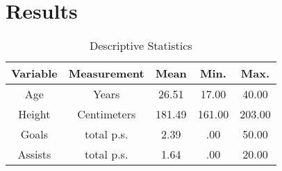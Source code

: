 \chapter{Results}

\lipsum[16]

\begin{table}[h]
\centering
    \begin{tabular}{c c c c c}
        \toprule
        \textbf{Variable} & \textbf{Measurement} & \textbf{Mean} & \textbf{Min.} & \textbf{Max.} \\ 
        \toprule
        Age     & Years         & 26.51     & 17.00     & 40.00     \\
        Height  & Centimeters   & 181.49    & 161.00    & 203.00    \\
        Goals   & total p.s.    & 2.39      & .00       & 50.00     \\
        Assists & total p.s.    & 1.64      & .00       & 20.00     \\
        \bottomrule
    \end{tabular}
\caption[Descriptive Statistics]{Descriptive Statistics \citep{muller2017beyond}}
\label{table:descriptive_statistics}
\end{table}

\lipsum[17-20]